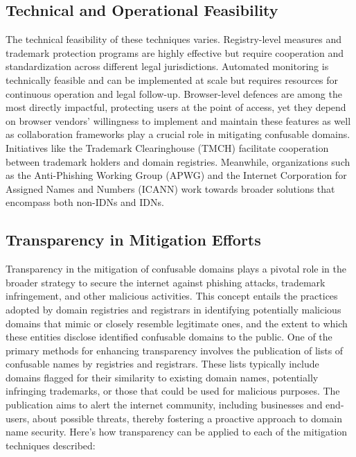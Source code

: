 \subsection{Technical and Operational Feasibility}
The technical feasibility of these techniques varies. Registry-level measures and trademark protection programs are highly effective but require cooperation and standardization across different legal jurisdictions. Automated monitoring is technically feasible and can be implemented at scale but requires resources for continuous operation and legal follow-up. Browser-level defences are among the most directly impactful, protecting users at the point of access, yet they depend on browser vendors' willingness to implement and maintain these features as well as collaboration frameworks play a crucial role in mitigating confusable domains. Initiatives like the Trademark Clearinghouse (TMCH) facilitate cooperation between trademark holders and domain registries. Meanwhile, organizations such as the Anti-Phishing Working Group (APWG) and the Internet Corporation for Assigned Names and Numbers (ICANN) work towards broader solutions that encompass both non-IDNs and IDNs.

\subsection{ Transparency in Mitigation Efforts}

Transparency in the mitigation of confusable domains plays a pivotal role in the broader strategy to secure the internet against phishing attacks, trademark infringement, and other malicious activities. This concept entails the practices adopted by domain registries and registrars in identifying potentially malicious domains that mimic or closely resemble legitimate ones, and the extent to which these entities disclose identified confusable domains to the public. One of the primary methods for enhancing transparency involves the publication of lists of confusable names by registries and registrars. These lists typically include domains flagged for their similarity to existing domain names, potentially infringing trademarks, or those that could be used for malicious purposes. The publication aims to alert the internet community, including businesses and end-users, about possible threats, thereby fostering a proactive approach to domain name security. Here's how transparency can be applied to each of the mitigation techniques described:

